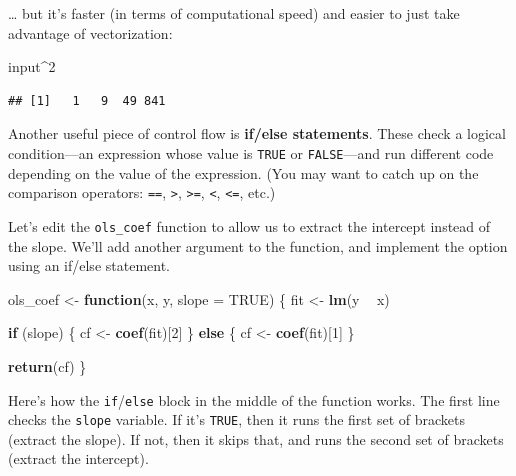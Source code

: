 \documentclass[12pt,oneside,openany]{book}
\newenvironment{Shaded}{\begin{snugshade}}{\end{snugshade}}
\newcommand{\KeywordTok}[1]{\textcolor[rgb]{0.13,0.29,0.53}{\textbf{#1}}}
\newcommand{\DataTypeTok}[1]{\textcolor[rgb]{0.13,0.29,0.53}{#1}}
\newcommand{\DecValTok}[1]{\textcolor[rgb]{0.00,0.00,0.81}{#1}}
\newcommand{\StringTok}[1]{\textcolor[rgb]{0.31,0.60,0.02}{#1}}
\newcommand{\OtherTok}[1]{\textcolor[rgb]{0.56,0.35,0.01}{#1}}
\newcommand{\ControlFlowTok}[1]{\textcolor[rgb]{0.13,0.29,0.53}{\textbf{#1}}}
\newcommand{\OperatorTok}[1]{\textcolor[rgb]{0.81,0.36,0.00}{\textbf{#1}}}
\newcommand{\NormalTok}[1]{#1}
\begin{document}
\ldots{} but it's faster (in terms of computational speed) and easier to
just take advantage of vectorization:

\begin{Shaded}
\begin{Highlighting}[]
\NormalTok{input}\OperatorTok{^}\DecValTok{2}
\end{Highlighting}
\end{Shaded}

\begin{verbatim}
## [1]   1   9  49 841
\end{verbatim}

Another useful piece of control flow is \textbf{if/else statements}.
These check a logical condition---an expression whose value is
\texttt{TRUE} or \texttt{FALSE}---and run different code depending on
the value of the expression. (You may want to catch up on the comparison
operators: \texttt{==}, \texttt{\textgreater{}},
\texttt{\textgreater{}=}, \texttt{\textless{}}, \texttt{\textless{}=},
etc.)

Let's edit the \texttt{ols\_coef} function to allow us to extract the
intercept instead of the slope. We'll add another argument to the
function, and implement the option using an if/else statement.

\begin{Shaded}
\begin{Highlighting}[]
\NormalTok{ols_coef <-}\StringTok{ }\ControlFlowTok{function}\NormalTok{(x, y, }\DataTypeTok{slope =} \OtherTok{TRUE}\NormalTok{) \{}
\NormalTok{  fit <-}\StringTok{ }\KeywordTok{lm}\NormalTok{(y }\OperatorTok{~}\StringTok{ }\NormalTok{x)}

  \ControlFlowTok{if}\NormalTok{ (slope) \{}
\NormalTok{    cf <-}\StringTok{ }\KeywordTok{coef}\NormalTok{(fit)[}\DecValTok{2}\NormalTok{]}
\NormalTok{  \} }\ControlFlowTok{else}\NormalTok{ \{}
\NormalTok{    cf <-}\StringTok{ }\KeywordTok{coef}\NormalTok{(fit)[}\DecValTok{1}\NormalTok{]}
\NormalTok{  \}}

  \KeywordTok{return}\NormalTok{(cf)}
\NormalTok{\}}
\end{Highlighting}
\end{Shaded}

Here's how the \texttt{if}/\texttt{else} block in the middle of the
function works. The first line checks the \texttt{slope} variable. If
it's \texttt{TRUE}, then it runs the first set of brackets (extract the
slope). If not, then it skips that, and runs the second set of brackets
(extract the intercept).
\end{document}
